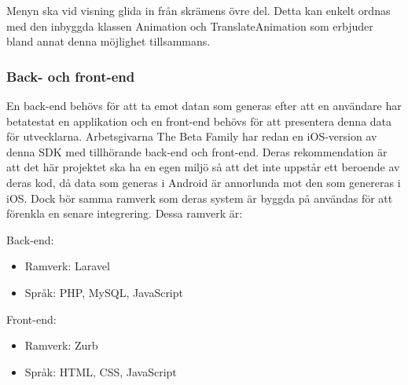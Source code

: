 Menyn ska vid visning glida in från skrämens övre del. Detta kan enkelt ordnas med den inbyggda klassen Animation och TranslateAnimation som erbjuder bland annat denna möjlighet tillsammans.

\subsubsection{Back- och front-end}
\label{subsubsec:backfront}
En back-end behövs för att ta emot datan som generas efter att en användare har betatestat en applikation och en front-end behövs för att presentera denna data för utvecklarna. Arbetsgivarna The Beta Family har redan en iOS-version av denna SDK med tillhörande back-end och front-end. Deras rekommendation är att det här projektet ska ha en egen miljö så att det inte uppstår ett beroende av deras kod, då data som generas i Android är annorlunda mot den som genereras i iOS. Dock bör samma ramverk som deras system är byggda på användas för att förenkla en senare integrering. Dessa ramverk är:

Back-end:
\begin{itemize}
	\item Ramverk: Laravel
	\item Språk: PHP, MySQL, JavaScript
\end{itemize}

Front-end:
\begin{itemize}
	\item Ramverk: Zurb
	\item Språk: HTML, CSS, JavaScript
\end{itemize}
